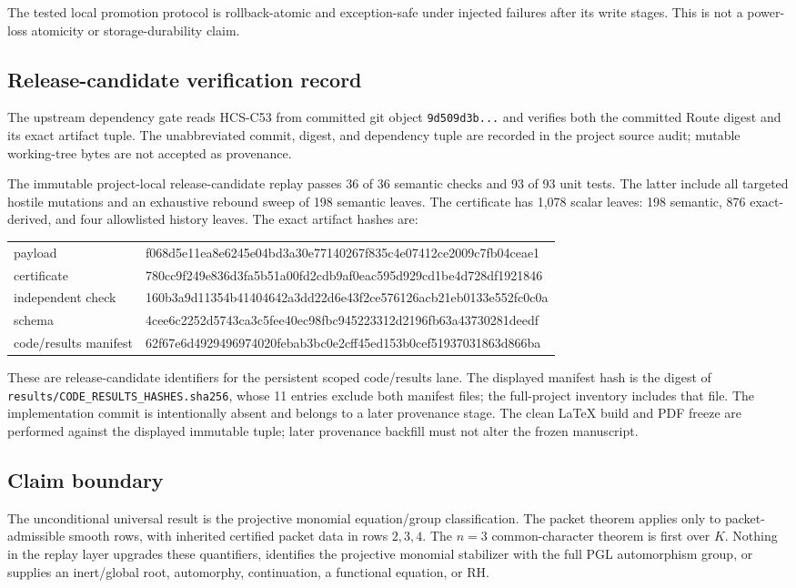 The tested local promotion protocol is rollback-atomic and exception-safe
under injected failures after its write stages.  This is not a power-loss
atomicity or storage-durability claim.

\subsection{Release-candidate verification record}

The upstream dependency gate reads HCS-C53 from committed git object
\texttt{9d509d3b...} and verifies both the committed Route digest and its
exact artifact tuple.  The unabbreviated commit, digest, and dependency tuple
are recorded in the project source audit; mutable working-tree bytes are not
accepted as provenance.

The immutable project-local release-candidate replay passes 36 of 36 semantic
checks and 93 of 93 unit tests.  The latter include all targeted hostile mutations and an
exhaustive rebound sweep of 198 semantic leaves.  The certificate has 1,078
scalar leaves: 198 semantic, 876 exact-derived, and four allowlisted
history leaves.  The exact artifact hashes are:
\begin{center}
\scriptsize\ttfamily
\begin{tabular}{@{}ll@{}}
payload & f068d5e11ea8e6245e04bd3a30e77140267f835c4e07412ce2009c7fb04ceae1\\
certificate & 780cc9f249e836d3fa5b51a00fd2cdb9af0eac595d929cd1be4d728df1921846\\
independent check & 160b3a9d11354b41404642a3dd22d6e43f2ce576126acb21eb0133e552fc0c0a\\
schema & 4cee6c2252d5743ca3c5fee40ec98fbc945223312d2196fb63a43730281deedf\\
code/results manifest & 62f67e6d4929496974020febab3bc0e2cff45ed153b0cef51937031863d866ba\\
\end{tabular}
\end{center}
These are release-candidate identifiers for the persistent scoped
code/results lane.  The displayed manifest hash is the digest of
\texttt{results/CODE\_RESULTS\_HASHES.sha256}, whose 11 entries exclude both
manifest files; the full-project inventory includes that file.  The
implementation commit is intentionally absent and belongs to a later
provenance stage.  The clean LaTeX build and PDF freeze are performed against
the displayed immutable tuple; later provenance backfill must not alter the
frozen manuscript.

\subsection{Claim boundary}

The unconditional universal result is the projective monomial
equation/group classification.  The packet theorem applies only to
packet-admissible smooth rows, with inherited certified packet data in rows
\(2,3,4\).  The \(n=3\) common-character theorem is first over \(K\).
Nothing in the replay layer upgrades these quantifiers, identifies the
projective monomial stabilizer with the full PGL automorphism group, or
supplies an inert/global root, automorphy, continuation, a functional
equation, or RH.
